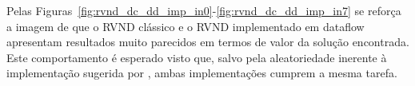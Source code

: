 Pelas Figuras~\ref{fig:rvnd_dc_dd_imp_in0}-\ref{fig:rvnd_dc_dd_imp_in7} se reforça a imagem de que o RVND clássico e o RVND implementado em dataflow apresentam resultados muito parecidos em termos de valor da solução encontrada.
Este comportamento é esperado visto que, salvo pela aleatoriedade inerente à implementação sugerida por \cite{souza2010}, ambas implementações cumprem a mesma tarefa.









